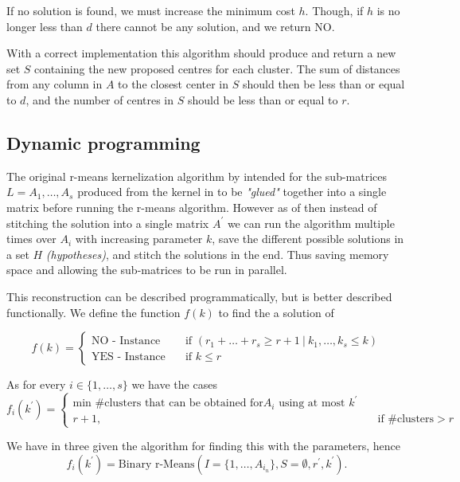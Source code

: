 \documentclass[a4paper]{article}
\begin{document}
If no solution is found, we must increase the minimum cost $h$. Though, if $h$ is no longer less than $d$ there cannot be any solution, and we return NO.



With a correct implementation this algorithm should produce and return a new set $S$ containing the new proposed
centres for each cluster. The sum of distances from any column in $A$ to the closest center in $S$ should then be
less than or equal to $d$, and the number of centres in $S$ should be less than or equal to $r$.

\subsection{Dynamic programming}
\label{sec:dynamic-result}
The original r-means kernelization algorithm by \cite{fomin_golovach_panolan_2020}
intended for the sub-matrices $L=A_1,\dots,A_s$ produced from the kernel in  to be \textit{"glued"} together 
into a single matrix before running the r-means algorithm. However as of  then instead of stitching the solution 
into a single matrix $A^\prime$ we can run the algorithm multiple times over $A_i$ with increasing parameter $k$,
save the different possible solutions in a set $H$ \textit{(hypotheses)}, and stitch the solutions in the end. Thus saving
memory space and allowing the sub-matrices to be run in parallel.

This reconstruction can be described programmatically, but is better described functionally. We define the function $f(k)$ to find
the a solution of 

\[ f(k) =
  \begin{cases}
    \text{NO - Instance}   & \quad \text{if } (r_1 + \hdots + r_s \geq r+1 ~|~ k_1, \hdots, k_s \leq k) \\
    \text{YES - Instance}  & \quad \text{if } k \leq r
  \end{cases}
\]

As for every $i \in \{1,\dots,s\}$ we have the cases
\[ f_i(k^\prime) =
    \begin{cases}
        \text{min \#clusters that can be obtained for} A_i \text{ using at most } k^\prime & \\
        r+1,  & \quad \text{if \#clusters} > r
    \end{cases}
\]

We have in  three given the algorithm for finding this with the parameters, hence 
\[ 
    f_i(k^\prime) = \text{Binary r-Means}(I=\{1,\dots, A_{i_n}\}, S = \emptyset, r^\prime, k^\prime).
\]
\end{document}
